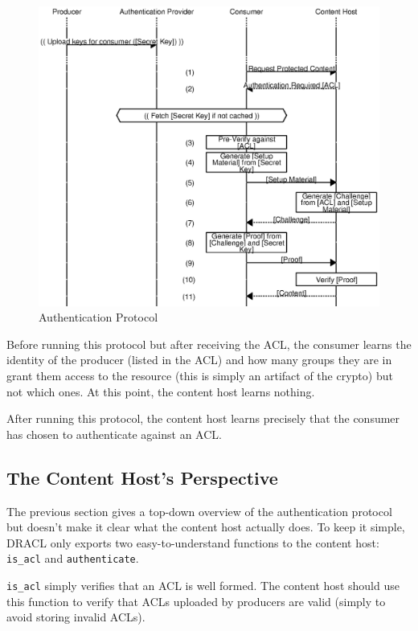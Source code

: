 \documentclass[pdftex,12pt,a4papaer,twoside,notitlepage]{report}
\begin{document}
\begin{figure}
    \includegraphics{auth.eps}
    \caption{Authentication Protocol}
    \label{fig:auth}
\end{figure}

Before running this protocol but after receiving the ACL, the consumer learns
the identity of the producer (listed in the ACL) and how many groups they are in
grant them access to the resource (this is simply an artifact of the crypto) but
not which ones. At this point, the content host learns nothing.

After running this protocol, the content host learns precisely that the consumer
has chosen to authenticate against an ACL.

\subsection{The Content Host's Perspective}

The previous section gives a top-down overview of the authentication protocol
but doesn't make it clear what the content host actually does. To keep it
simple, DRACL only exports two easy-to-understand functions to the content host:
\verb=is_acl= and \verb=authenticate=.

\verb=is_acl= simply verifies that an ACL is well formed. The content host
should use this function to verify that ACLs uploaded by producers are valid
(simply to avoid storing invalid ACLs).
\end{document}

